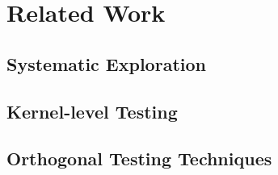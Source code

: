 \section{Related Work}

\subsection{Systematic Exploration}

\subsection{Kernel-level Testing}

\subsection{Orthogonal Testing Techniques}

